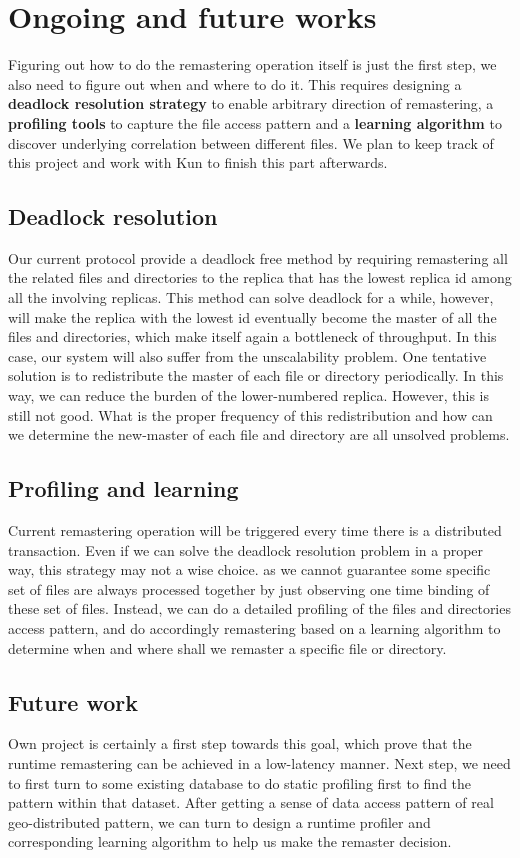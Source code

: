 \section{Ongoing and future works}
Figuring out how to do the remastering operation itself is just the first step, we also need to figure out when and where to do it. This requires designing a \textbf{deadlock resolution strategy} to enable arbitrary direction of remastering,  a \textbf{profiling tools} to capture the file access pattern and a \textbf{learning algorithm} to discover underlying correlation between different files. We plan to keep track of this project and work with Kun to finish this part afterwards.

\subsection{Deadlock resolution}
Our current protocol provide a deadlock free method by requiring remastering all the related files and directories to the replica that has the lowest replica id among all the involving replicas. This method can solve deadlock for a while, however, will make the replica with the lowest id eventually become the master of all the files and directories, which make itself again a bottleneck of throughput. In this case, our system will also suffer from the unscalability problem. One tentative solution is to redistribute the master of each file or directory periodically. In this way, we can reduce the burden of the lower-numbered replica. However, this is still not good. What is the proper frequency of this redistribution and how can we determine the new-master of each file and directory are all unsolved problems.

\subsection{Profiling and learning}
Current remastering operation will be triggered every time there is a distributed transaction. Even if we can solve the deadlock resolution problem in a proper way, this strategy may not a wise choice. as we cannot guarantee some specific set of files are always processed together by just observing one time binding of these set of files. Instead, we can do a detailed profiling of the files and directories access pattern, and do accordingly remastering based on a learning algorithm to determine when and where shall we remaster a specific file or directory. 

\subsection{Future work}
Own project is certainly a first step towards this goal, which prove that the runtime remastering can be achieved in a low-latency manner. Next step, we need to first turn to some existing database to do static profiling first to find the pattern within that dataset. After getting a sense of data access pattern of real geo-distributed pattern, we can turn to design a runtime profiler and corresponding learning algorithm to help us make the remaster decision.



